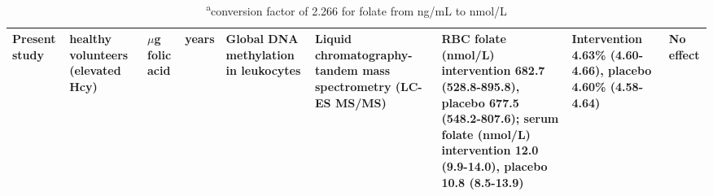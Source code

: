 \begin{sidewaystable}[hp!]
\begin{tabular}{L{1.3cm}C{1.5cm}C{1.5cm}C{1.2cm}C{1.4cm}C{1.5cm}C{2.2cm}C{2cm}C{1.8cm}}
\parbox[t][3.5cm]{1.3cm}{\raggedright Present study} &
\parbox[t][3.5cm]{1.5cm}{ healthy volunteers (elevated Hcy)} &
\parbox[t][3.5cm]{1.5cm}{$\mu$g folic acid} &
\parbox[t][3.5cm]{1.2cm}{ years} &
\parbox[t][3.5cm]{1.4cm}{\centering Global DNA methylation in leukocytes} &
\parbox[t][3.5cm]{1.5cm}{\centering Liquid chromatography-tandem mass spectrometry (LC-ES MS/MS)} &
\parbox[t][3.5cm]{2.2cm}{\centering RBC folate (nmol/L) intervention 682.7 (528.8-895.8), placebo 677.5 (548.2-807.6); serum folate (nmol/L) intervention 12.0 (9.9-14.0), placebo 10.8 (8.5-13.9)} &
\parbox[t][3.5cm]{2.0cm}{\centering Intervention 4.63\% (4.60-4.66), placebo 4.60\% (4.58-4.64)} &
\parbox[t][3.5cm]{1.8cm}{\centering No effect}\\
\hline
\end{tabular}
\caption*{\footnotesize{\textsuperscript{a}conversion factor of 2.266 for folate from ng/mL to nmol/L}}
\end{sidewaystable}
